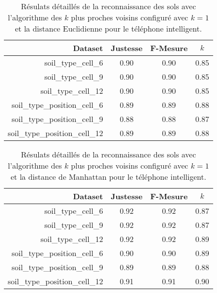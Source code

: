 \begin{table}[H]\renewcommand{\arraystretch}{0.5}
	\centering
	\caption{Résulats détaillés de la reconnaissance des sols avec l'algorithme des $k$ plus proches voisins configuré avec $k=1$ et la distance Euclidienne pour le téléphone intelligent.}
	\label{tab:tab:knn-dE-cell}
	\begin{tabular}{@{}rccc@{}}
		\toprule
			\textbf{Dataset} & \textbf{Justesse} & \textbf{F-Mesure} & \textbf{$k$} \\
		\midrule
			soil\_type\_cell\_6 & 0.90 & 0.90 & 0.85 \\
			soil\_type\_cell\_9 & 0.90 & 0.90 & 0.85 \\
			soil\_type\_cell\_12 & 0.90 & 0.90 & 0.85 \\
			soil\_type\_position\_cell\_6 & 0.89 & 0.89 & 0.88 \\
			soil\_type\_position\_cell\_9 & 0.88 & 0.88 & 0.87 \\
			soil\_type\_position\_cell\_12 & 0.89 & 0.89 & 0.88 \\
		\bottomrule
	\end{tabular}
\end{table}

\begin{table}[H]\renewcommand{\arraystretch}{0.5}
	\centering
	\caption{Résulats détaillés de la reconnaissance des sols avec l'algorithme des $k$ plus proches voisins configuré avec $k=1$ et la distance de Manhattan pour le téléphone intelligent.}
	\label{tab:tab:knn-dM-cell}
	\begin{tabular}{@{}rccc@{}}
		\toprule
			\textbf{Dataset} & \textbf{Justesse} & \textbf{F-Mesure} & \textbf{$k$} \\
		\midrule
			soil\_type\_cell\_6 & 0.92 & 0.92 & 0.87 \\
			soil\_type\_cell\_9 & 0.92 & 0.92 & 0.87 \\
			soil\_type\_cell\_12 & 0.92 & 0.92 & 0.89 \\
			soil\_type\_position\_cell\_6 & 0.90 & 0.90 & 0.89 \\
			soil\_type\_position\_cell\_9 & 0.89 & 0.89 & 0.88 \\
			soil\_type\_position\_cell\_12 & 0.91 & 0.91 & 0.90 \\
		\bottomrule
	\end{tabular}
\end{table}